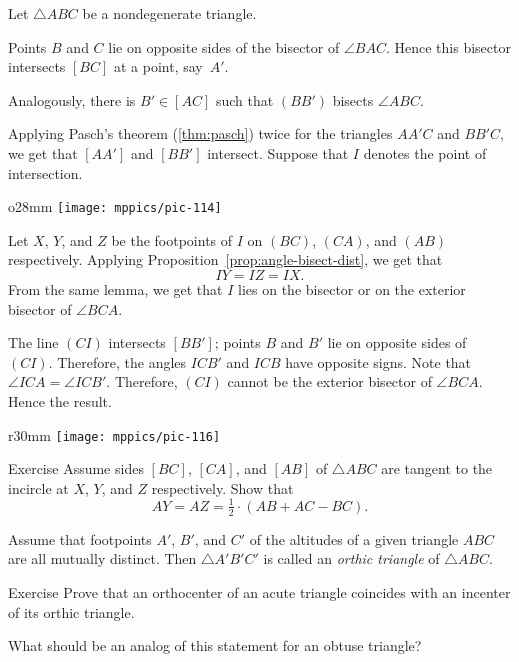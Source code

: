 Let $\triangle ABC$ be a nondegenerate triangle.

Points $B$ and $C$ lie on opposite sides of the bisector of $\angle BAC$.
Hence this bisector intersects $[BC]$ at a point, say~$A'$.

Analogously, there is $B'\in[AC]$ 
such that $(BB')$ bisects $\angle ABC$.


Applying Pasch's theorem (\ref{thm:pasch}) twice
for the triangles $AA'C$ and $BB'C$,
we get that $[AA']$ and $[BB']$ intersect.
Suppose that $I$ denotes the point of intersection.

{

\begin{wrapfigure}{o}{28mm}
\vskip0mm
\centering
\texttt{[image: mppics/pic-114]}
\end{wrapfigure}

Let $X$, $Y$, and $Z$ be the footpoints of $I$ on  $(B C)$, $(C A)$, and $(A B)$ respectively.
Applying Proposition~\ref{prop:angle-bisect-dist}, we get that
$$I Y=I Z=I X.$$
From the same lemma, we get that $I$ lies on the bisector or on the exterior bisector of $\angle B C A$.

The line $(C I)$ intersects $[B B']$;
points $B$ and $B'$ lie on opposite sides of~$(C I)$.
Therefore, the angles $I C B'$ and $I C B$ have opposite signs.
Note that $\angle I C A=\angle I C B'$.
Therefore, $(C I)$ cannot be the exterior bisector of $\angle B C A$.
Hence the result.
\qeds

}

{

\begin{wrapfigure}{r}{30mm}
\centering
\vskip-2mm
\texttt{[image: mppics/pic-116]}
\end{wrapfigure}

\begin{thm}{Exercise}\label{ex:2x=b+c-a}
Assume sides $[B C]$, $[C A]$, and $[A B]$ of $\triangle A B C$ are tangent to the incircle at $X$, $Y$, and $Z$ respectively. 
Show that 
$$AY=AZ= \tfrac12\cdot(A B+ A C- B C).$$

\end{thm}

Assume that footpoints $A'$, $B'$, and $C'$ of the altitudes of a given triangle $ABC$ are all mutually distinct.
Then $\triangle A'B'C'$ is called an \emph{orthic triangle} of $\triangle ABC$.

}

\begin{thm}{Exercise}\label{ex:orthic-triangle}
Prove that an orthocenter of an acute triangle coincides with an incenter of its orthic triangle.

What should be an analog of this statement for an obtuse triangle?
\end{thm}

